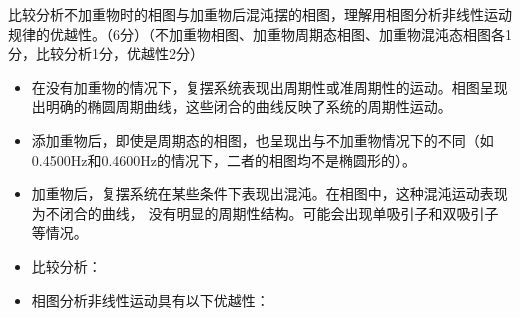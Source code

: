 \documentclass[dvipsnames, svgnames,a4paper,11pt]{article}
\begin{document}
	\begin{question}
		比较分析不加重物时的相图与加重物后混沌摆的相图，理解用相图分析非线性运动规律的优越性。（6分）（不加重物相图、加重物周期态相图、加重物混沌态相图各1分，比较分析1分，优越性2分）
	\end{question}
	\begin{itemize}
		\item 在没有加重物的情况下，复摆系统表现出周期性或准周期性的运动。相图呈现出明确的椭圆周期曲线，这些闭合的曲线反映了系统的周期性运动。 
		
		\item 添加重物后，即使是周期态的相图，也呈现出与不加重物情况下的不同（如0.4500Hz和0.4600Hz的情况下，二者的相图均不是椭圆形的）。
		
		\item 加重物后，复摆系统在某些条件下表现出混沌。在相图中，这种混沌运动表现为不闭合的曲线， 没有明显的周期性结构。可能会出现单吸引子和双吸引子等情况。
		
		\item 比较分析：
		
		\item 相图分析非线性运动具有以下优越性：
		

\end{itemize}
\end{document}
